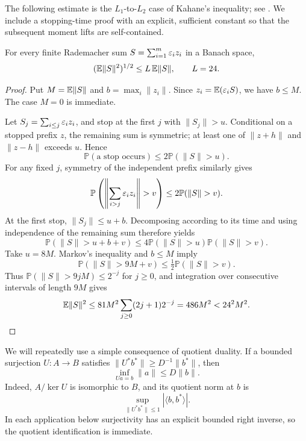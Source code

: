 The following estimate is the \(L_1\)-to-\(L_2\) case of Kahane's
inequality; see \cite[Theorem~8.1]{Pis11IHP}.
We include a stopping-time proof with an explicit, sufficient constant
so that the subsequent moment lifts are self-contained.

\begin{lemma}\label{lem:kahane}
For every finite Rademacher sum \(S=\sum_{i=1}^m\varepsilon_i z_i\) in a Banach
space,
\begin{equation}\label{eq:kahane}
(\mathbb E\|S\|^2)^{1/2}\le L\,\mathbb E\|S\|,\qquad L=24.
\end{equation}
\end{lemma}
\begin{proof}
Put \(M=\mathbb E\|S\|\) and \(b=\max_i\|z_i\|\).
Since \(z_i=\mathbb E(\varepsilon_iS)\), we have \(b\le M\).
The case \(M=0\) is immediate.

Let \(S_j=\sum_{i\le j}\varepsilon_i z_i\), and stop at the first \(j\) with
\(\|S_j\|>u\). Conditional on a stopped prefix \(z\), the remaining
sum is symmetric; at least one of \(\|z+h\|\) and \(\|z-h\|\)
exceeds \(u\). Hence
\[
\mathbb P(\text{a stop occurs})\le2\mathbb P(\|S\|>u).
\]
For any fixed \(j\), symmetry of the independent prefix similarly gives
\[
\mathbb P\left(\left\|\sum_{i>j}\eps_i z_i\right\|>v\right)
\le2\mathbb P(\|S\|>v).
\]
At the first stop, \(\|S_j\|\le u+b\). Decomposing according to its
time and using independence of the remaining sum therefore yields
\[
\mathbb P(\|S\|>u+b+v)
\le4\mathbb P(\|S\|>u)\mathbb P(\|S\|>v).
\]
Take \(u=8M\). Markov's inequality and \(b\le M\) imply
\[
\mathbb P(\|S\|>9M+v)\le\tfrac12\mathbb P(\|S\|>v).
\]
Thus \(\mathbb P(\|S\|>9jM)\le2^{-j}\) for \(j\ge0\), and integration
over consecutive intervals of length \(9M\) gives
\[
\mathbb E\|S\|^2
\le81M^2\sum_{j\ge0}(2j+1)2^{-j}
=486M^2<24^2M^2.
\]
\end{proof}

We will repeatedly use a simple consequence of quotient duality.
If a bounded surjection \(U:A\to B\) satisfies
\(\|U^*b^*\|\ge D^{-1}\|b^*\|\), then
\begin{equation}\label{eq:quotient-lift}
\inf_{Ua=b}\|a\|\le D\|b\|.
\end{equation}
Indeed, \(A/\ker U\) is isomorphic to \(B\), and its quotient norm at
\(b\) is
\[
\sup_{\|U^*b^*\|\le1}|\langle b,b^*\rangle|.
\]
In each application below surjectivity has an explicit bounded right
inverse, so the quotient identification is immediate.

